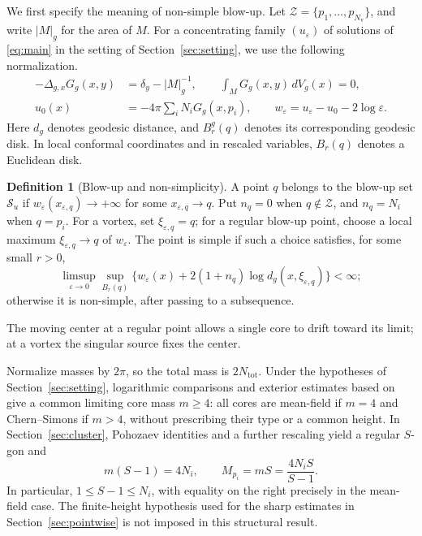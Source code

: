 \documentclass[11pt,reqno]{amsart}
\numberwithin{equation}{section}
\theoremstyle{definition}
\newtheorem{definition}[theorem]{Definition}
\theoremstyle{remark}
\newcommand{\cS}{\mathcal S}
\newcommand{\eps}{\varepsilon}
\newcommand{\tot}{\mathrm{tot}}
\begin{document}
We first specify the meaning of non-simple blow-up. Let
$\mathcal Z=\{p_1,\ldots,p_{N_{\mathrm v}}\}$, and write $|M|_g$
for the area of $M$. For a concentrating family $(u_\eps)$ of solutions
of \eqref{eq:main} in the setting of Section~\ref{sec:setting},
we use the following normalization.
\begin{align}
 -\Delta_{g,x}G_g(x,y)&=\delta_y-|M|_g^{-1},\qquad
 \int_MG_g(x,y)\,dV_g(x)=0,\label{eq:green}\\
 u_0(x)&=-4\pi\sum_iN_iG_g(x,p_i),\qquad
 w_\eps=u_\eps-u_0-2\log\eps.\label{eq:u0-w}
\end{align}
Here $d_g$ denotes geodesic distance, and $B_r^g(q)$ denotes
its corresponding geodesic disk. In local conformal coordinates
and in rescaled variables, $B_r(q)$ denotes a Euclidean disk.
\begin{definition}[Blow-up and non-simplicity]\label{def:simple}
A point $q$ belongs to the blow-up set $\cS_u$ if
$w_\eps(x_{\eps,q})\to+\infty$ for some $x_{\eps,q}\to q$.
Put $n_q=0$ when $q\notin\mathcal Z$, and $n_q=N_i$ when $q=p_i$.
For a vortex, set $\xi_{\eps,q}=q$; for a regular blow-up point,
choose a local maximum $\xi_{\eps,q}\to q$ of $w_\eps$.
The point is simple if such a choice satisfies, for some small $r>0$,
\begin{equation}\label{eq:simple}
 \limsup_{\eps\to0}\sup_{B_r(q)}
 \{w_\eps(x)+2(1+n_q)\log d_g(x,\xi_{\eps,q})\}<\infty;
\end{equation}
otherwise it is non-simple, after passing to a subsequence.
\end{definition}
The moving center at a regular point allows a single core to drift
toward its limit; at a vortex the singular source fixes the center.

Normalize masses by $2\pi$, so the total mass is $2N_{\tot}$.
Under the hypotheses of Section~\ref{sec:setting}, logarithmic
comparisons and exterior estimates based on \cite{CKL,LinYanAIHP}
give a common limiting core mass $m\ge4$: all cores are mean-field
if $m=4$ and Chern--Simons if $m>4$, without prescribing their type
or a common height. In Section~\ref{sec:cluster}, Pohozaev identities
and a further rescaling yield a regular $S$-gon and
\[
 m(S-1)=4N_i,\qquad M_{p_i}=mS=\frac{4N_iS}{S-1}.
\]
In particular, $1\le S-1\le N_i$, with equality on the right precisely in the
mean-field case. The finite-height hypothesis used for the sharp
estimates in Section~\ref{sec:pointwise} is not imposed in this
structural result.
\end{document}
